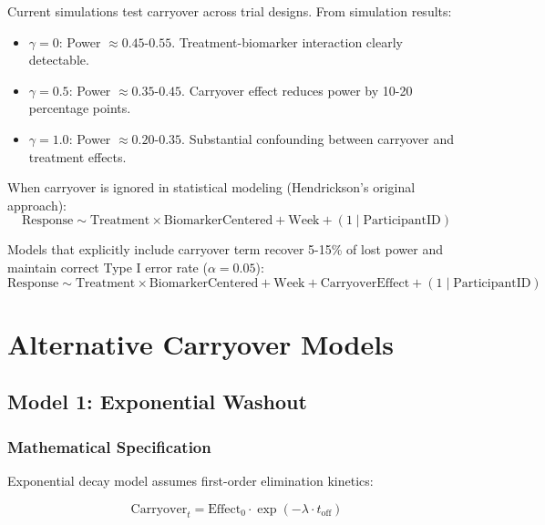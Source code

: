 \documentclass[11pt,a4paper]{article}
\begin{document}
Current simulations test carryover across trial designs. From simulation results:

\begin{itemize}
  \item \textbf{$\gamma = 0$}: Power $\approx 0.45$-$0.55$. Treatment-biomarker interaction clearly detectable.
  \item \textbf{$\gamma = 0.5$}: Power $\approx 0.35$-$0.45$. Carryover effect reduces power by 10-20 percentage points.
  \item \textbf{$\gamma = 1.0$}: Power $\approx 0.20$-$0.35$. Substantial confounding between carryover and treatment effects.
\end{itemize}

When carryover is ignored in statistical modeling (Hendrickson's original approach):
\begin{equation}
  \text{Response} \sim \text{Treatment} \times \text{BiomarkerCentered} + \text{Week} + (1 \mid \text{ParticipantID})
\end{equation}

Models that explicitly include carryover term recover 5-15\% of lost power and maintain correct Type I error rate ($\alpha = 0.05$):
\begin{equation}
  \text{Response} \sim \text{Treatment} \times \text{BiomarkerCentered} + \text{Week} + \text{CarryoverEffect} + (1 \mid \text{ParticipantID})
\end{equation}

\section{Alternative Carryover Models}
\label{sec:alternatives}

\subsection{Model 1: Exponential Washout}
\label{subsec:exponential}

\subsubsection{Mathematical Specification}

Exponential decay model assumes first-order elimination kinetics:

\begin{equation}
  \text{Carryover}_t = \text{Effect}_0 \cdot \exp(-\lambda \cdot t_{\text{off}})
\end{equation}
\end{document}
